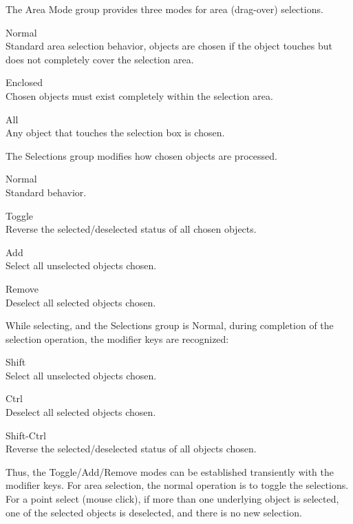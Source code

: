The {\cb Area Mode} group provides three modes for area (drag-over)
selections.

\begin{description}
\item{\et Normal}\\ Standard area selection behavior, objects are chosen
  if the object touches but does not completely cover the selection
  area.
\item{\et Enclosed}\\ Chosen objects must exist completely within the
  selection area.
\item{\et All}\\ Any object that touches the selection box is chosen.
\end{description}

The {\cb Selections} group modifies how chosen objects are processed.

\begin{description}
\item{\et Normal}\\ Standard behavior.
\item{\et Toggle}\\ Reverse the selected/deselected status of all chosen
  objects.
\item{\et Add}\\ Select all unselected objects chosen.
\item{\et Remove}\\ Deselect all selected objects chosen.
\end{description}

While selecting, and the {\cb Selections} group is {\et Normal},
during completion of the selection operation, the modifier keys are
recognized:

\begin{description}
\item{\kb Shift}\\ Select all unselected objects chosen.
\item{\kb Ctrl}\\ Deselect all selected objects chosen.
\item{\kb Shift-Ctrl}\\ Reverse the selected/deselected status of all
   objects chosen.
\end{description}

Thus, the {\et Toggle}/{\et Add}/{\et Remove} modes can be established
transiently with the modifier keys.  For area selection, the normal
operation is to toggle the selections.  For a point select (mouse
click), if more than one underlying object is selected, one of the
selected objects is deselected, and there is no new selection.

